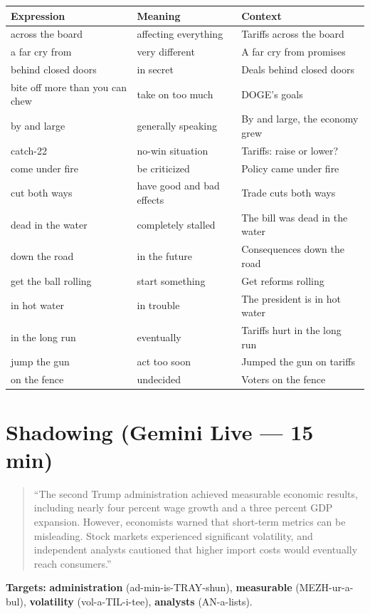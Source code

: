 \documentclass[10pt,a4paper]{article}
\begin{document}
\begin{center}
\small
\begin{tabular}{lll}
\toprule
\textbf{Expression} & \textbf{Meaning} & \textbf{Context} \\
\midrule
across the board & affecting everything & Tariffs across the board \\
a far cry from & very different & A far cry from promises \\
behind closed doors & in secret & Deals behind closed doors \\
bite off more than you can chew & take on too much & DOGE's goals \\
by and large & generally speaking & By and large, the economy grew \\
catch-22 & no-win situation & Tariffs: raise or lower? \\
come under fire & be criticized & Policy came under fire \\
cut both ways & have good and bad effects & Trade cuts both ways \\
dead in the water & completely stalled & The bill was dead in the water \\
down the road & in the future & Consequences down the road \\
get the ball rolling & start something & Get reforms rolling \\
in hot water & in trouble & The president is in hot water \\
in the long run & eventually & Tariffs hurt in the long run \\
jump the gun & act too soon & Jumped the gun on tariffs \\
on the fence & undecided & Voters on the fence \\
\bottomrule
\end{tabular}
\end{center}

\section*{Shadowing (Gemini Live --- 15 min)}

\begin{quote}\small
``The second Trump administration achieved measurable economic
results, including nearly four percent wage growth and a three
percent GDP expansion. However, economists warned that short-term
metrics can be misleading. Stock markets experienced significant
volatility, and independent analysts cautioned that higher import
costs would eventually reach consumers.''
\end{quote}

\textbf{Targets:} \textbf{administration} (ad-min-is-TRAY-shun),
\textbf{measurable} (MEZH-ur-a-bul), \textbf{volatility}
(vol-a-TIL-i-tee), \textbf{analysts} (AN-a-lists).
\end{document}
